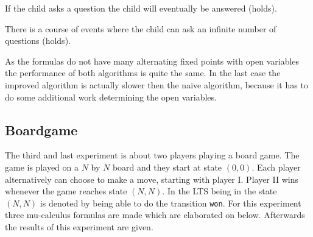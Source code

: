 \documentclass[10pt,a4paper]{article}
\begin{document}
If the child asks a question the child will eventually be answered (holds).


There is a course of events where the child can ask an infinite number of questions (holds).


As the formulas do not have many alternating fixed points with open variables the performance of both algorithms is quite the same. In the last case the improved algorithm is actually slower then the naive algorithm, because it has to do some additional work determining the open variables.

\subsection{Boardgame}
The third and last experiment is about two players playing a board game. The game is played on a $N$ by $N$ board and they start at state $(0, 0)$. Each player alternatively can choose to make a move, starting with player I. Player II wins whenever the game reaches state $(N, N)$. In the LTS being in the state $(N, N)$ is denoted by being able to do the transition {\tt won}. For this experiment three mu-calculus formulas are made which are elaborated on below. Afterwards the results of this experiment are given.
\end{document}
